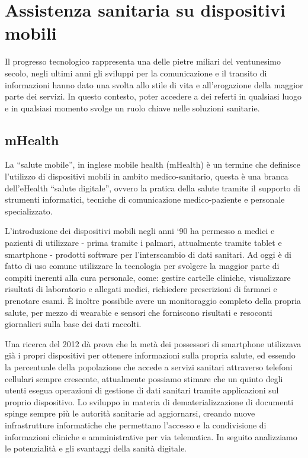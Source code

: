 \documentclass[12pt,a4paper,openright,twoside]{report}
\begin{document}
\section{Assistenza sanitaria su dispositivi mobili}
Il progresso tecnologico rappresenta una delle pietre miliari del ventunesimo secolo, negli ultimi anni gli sviluppi per la comunicazione e il transito di informazioni hanno dato una svolta allo stile di vita e all'erogazione della maggior parte dei servizi. In questo contesto, poter accedere a dei referti in qualsiasi luogo e in qualsiasi momento svolge un ruolo chiave nelle soluzioni sanitarie\cite{SILVA2015265}. 

\subsection{mHealth}
La ``salute mobile'', in inglese mobile health (mHealth) è un termine che definisce l'utilizzo di dispositivi mobili in ambito medico-sanitario, questa è una branca dell'eHealth ``salute digitale'', ovvero la pratica della salute tramite il supporto di strumenti informatici, tecniche di comunicazione medico-paziente e personale specializzato.

L'introduzione dei dispositivi mobili negli anni `90 ha permesso a medici e pazienti di utilizzare - prima tramite i palmari, attualmente tramite tablet e smartphone - prodotti software per l'interscambio di dati sanitari. Ad oggi è di fatto di uso comune utilizzare la tecnologia per svolgere la maggior parte di compiti inerenti alla cura personale, come: gestire cartelle cliniche, visualizzare risultati di laboratorio e allegati medici, richiedere prescrizioni di farmaci e prenotare esami. È inoltre possibile avere un monitoraggio completo della propria salute, per mezzo di wearable e sensori che forniscono risultati e resoconti giornalieri sulla base dei dati raccolti.

Una ricerca \cite{fox2010mobile} del 2012 dà prova che la metà dei possessori di smartphone utilizzava già i propri dispositivi per ottenere informazioni sulla propria salute, ed essendo la percentuale della popolazione che accede a servizi sanitari attraverso telefoni cellulari sempre crescente, attualmente possiamo stimare che un quinto degli utenti esegua operazioni di gestione di dati sanitari tramite applicazioni sul proprio dispositivo.
Lo sviluppo in materia di dematerializzazione di documenti spinge sempre più le autorità sanitarie ad aggiornarsi, creando nuove infrastrutture informatiche che permettano l'accesso e la condivisione di informazioni cliniche e amministrative per via telematica.
In seguito analizziamo le potenzialità e gli svantaggi della sanità digitale.
\end{document}
